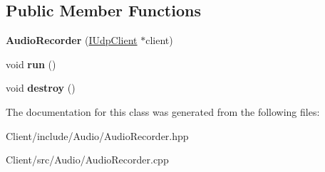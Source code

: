 \subsection*{Public Member Functions}
\begin{DoxyCompactItemize}
\item 
\mbox{\label{classbbl_1_1cli_1_1audio_1_1_audio_recorder_aab286f8a53246a44c709daf1f1059598}} 
{\bfseries Audio\+Recorder} (\hyperlink{classbbl_1_1cli_1_1_i_udp_client}{I\+Udp\+Client} $\ast$client)
\item 
\mbox{\label{classbbl_1_1cli_1_1audio_1_1_audio_recorder_adf6273d04355b7cdb0b4594bb981e759}} 
void {\bfseries run} ()
\item 
\mbox{\label{classbbl_1_1cli_1_1audio_1_1_audio_recorder_aa06624646e90292ba5c7ea9dcfff3cfa}} 
void {\bfseries destroy} ()
\end{DoxyCompactItemize}


The documentation for this class was generated from the following files\+:\begin{DoxyCompactItemize}
\item 
Client/include/\+Audio/Audio\+Recorder.\+hpp\item 
Client/src/\+Audio/Audio\+Recorder.\+cpp\end{DoxyCompactItemize}
